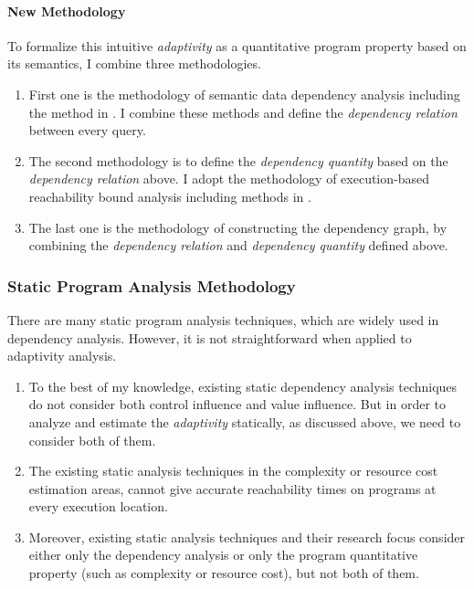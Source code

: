 \paragraph{New Methodology}
 To formalize this intuitive \emph{adaptivity} as a quantitative program property based on its semantics, 
I combine three
methodologies.
\begin{enumerate}
   \item First one is  
   the methodology of semantic data dependency analysis
   including the method in \cite{Cousot19a, ZanioliC11, CheneyAA11}.
   I combine these methods and define the \emph{dependency relation} between every query.
   \item The second methodology is to define the \emph{dependency quantity} 
  based on the \emph{dependency relation} above.
  I adopt the methodology of execution-based reachability bound analysis including methods in
  \cite{AssafNSTT17}.
   \item The last one is the methodology of constructing the dependency graph, by combining the \emph{dependency relation} and \emph{dependency quantity} defined above.
      \end{enumerate}
\subsubsection{Static Program Analysis Methodology}
\label{sec:intro-static}
There are many static program analysis techniques, which are widely used in dependency analysis. 
However, it is not straightforward when applied to adaptivity analysis.
\begin{enumerate}
\item To the best of my knowledge,
existing static dependency analysis techniques do not consider both control influence and value influence.
But in order to analyze and estimate the \emph{adaptivity} statically, as discussed above, we need to consider both of them.
\item The existing static analysis techniques in the complexity or resource cost estimation areas,
cannot give accurate reachability times on programs 
at every execution location.
\item Moreover, existing static analysis techniques and their research focus consider
either only the dependency analysis
or only the program quantitative property (such as complexity or resource cost),
but not both of them.
\end{enumerate}

